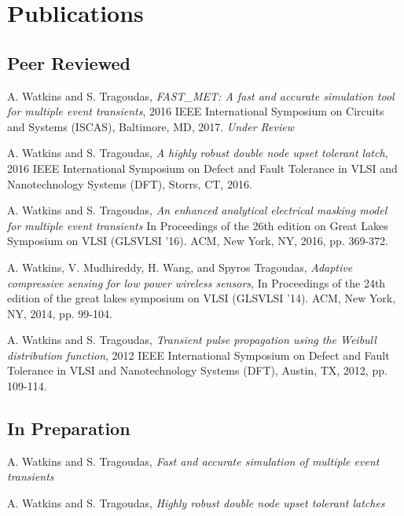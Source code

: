 \documentclass[letterpaper]{article}
\renewenvironment{itemize}{
  \begin{list}{}{
    \setlength{\leftmargin}{1.5em}
  }
}{
  \end{list}
}
\begin{document}
\section*{Publications}

\subsection*{Peer Reviewed}

\begin{itemize}
\item A. Watkins and S. Tragoudas, \emph{FAST\_MET: A fast and accurate simulation tool for multiple event transients}, 2016 IEEE International Symposium on Circuits and Systems (ISCAS), Baltimore, MD, 2017. \it{Under Review}
	
\item A. Watkins and S. Tragoudas, \emph{A highly robust double node upset tolerant latch}, 2016 IEEE International Symposium on Defect and Fault Tolerance in VLSI and Nanotechnology Systems (DFT), Storrs, CT, 2016.
	
\item A. Watkins and S. Tragoudas, \emph{An enhanced analytical electrical masking model for multiple event transients} In Proceedings of the 26th edition on Great Lakes Symposium on VLSI (GLSVLSI '16). ACM, New York, NY, 2016, pp. 369-372.
	
\item A. Watkins, V. Mudhireddy, H. Wang, and Spyros Tragoudas, \emph{Adaptive compressive sensing for low power wireless sensors}, In Proceedings of the 24th edition of the great lakes symposium on VLSI (GLSVLSI '14). ACM, New York, NY, 2014, pp. 99-104.
	
\item A. Watkins and S. Tragoudas, \emph{Transient pulse propagation using the Weibull distribution function}, 2012 IEEE International Symposium on Defect and Fault Tolerance in VLSI and Nanotechnology Systems (DFT), Austin, TX, 2012, pp. 109-114.
\end{itemize}

\subsection*{In Preparation}

\begin{itemize}
\item A. Watkins and S. Tragoudas, \emph{Fast and accurate simulation of multiple event transients}

\item A. Watkins and S. Tragoudas, \emph{Highly robust double node upset tolerant latches}
\end{itemize}
\end{document}
